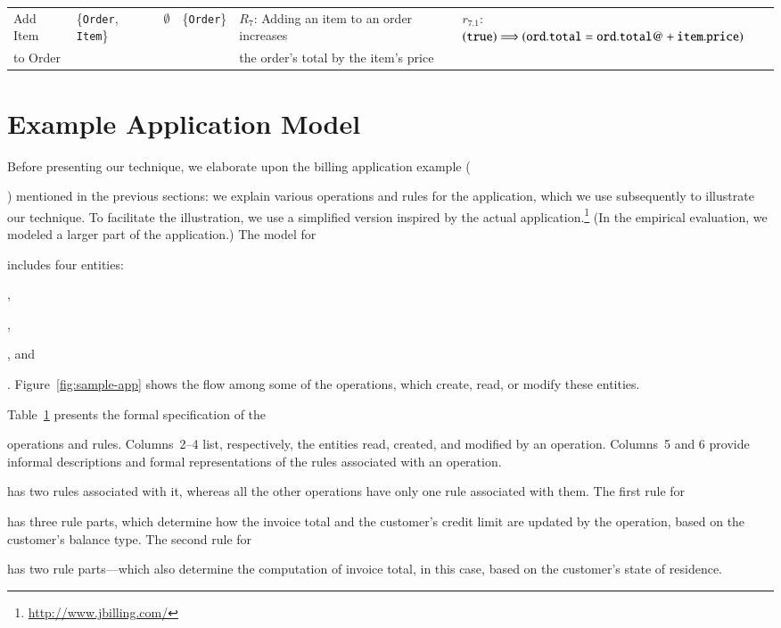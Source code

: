 \begin{table}[t]
{\begin{tabular}{|l|l|l|l|l|l|}
Add Item & \{{\tt Order}, {\tt Item}\} &
\multicolumn{1}{|c|}{$\emptyset$} & \{{\tt Order}\} &
$R_7$: Adding an item to an order increases &
$r_{7.1}$: $({\tt true}) \Longrightarrow ({\tt ord.total} = {\tt ord.total@} +
{\tt item.price})$ \\
to Order & & & & the order's total by the item's price & \\
\hline
\end{tabular}
}
\vspace*{-3ex}
\label{tab:bookstore-rules-spec}
\end{table}

\section{Example Application Model}
\label{sec:example}

Before presenting our technique, we elaborate upon the billing application
example (\subject{jBilling}) mentioned in the previous sections: we explain
various operations and rules for the application, which we use subsequently to
illustrate our technique. To facilitate the illustration, we use a simplified
version inspired by the actual application.\footnote{\scriptsize
  \url{http://www.jbilling.com/}} (In the empirical evaluation, we modeled a
larger part of the application.) The model for \subject{jBilling} includes four
entities: \subject{Customer}, \subject{Item}, \subject{Order}, and
\subject{Invoice}.  Figure~\ref{fig:sample-app} shows the flow among some of the
operations, which create, read, or modify these entities. 

Table~\ref{tab:bookstore-rules-spec} presents the formal specification of the
\subject{jBilling} operations and rules. Columns~2--4 list, respectively, the
entities read, created, and modified by an operation. Columns~5 and 6 provide
informal descriptions and formal representations of the rules associated with an
operation.  \subject{GenerateInvoice} has two rules associated with it, whereas
all the other operations have only one rule associated with them. The first rule
for \subject{GenerateInvoice} has three rule parts, which determine how the
invoice total and the customer's credit limit are updated by the operation,
based on the customer's balance type.  The second rule for
\subject{GenerateInvoice} has two rule parts---which also determine the
computation of invoice total, in this case, based on the customer's state of
residence.

